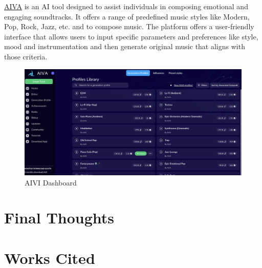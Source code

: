 \documentclass[
]{book}
\begin{document}
\href{https://www.aiva.ai/}{AIVA} is an AI tool designed to assist individuals in composing emotional and engaging soundtracks. It offers a range of predefined music styles like Modern, Pop, Rock, Jazz, etc. and to compose music. The platform offers a user-friendly interface that allows users to input specific parameters and preferences like style, mood and instrumentation and then generate original music that aligns with those criteria.

\begin{figure}

{\centering \includegraphics[width=0.95\linewidth]{AIVI_Dashboard} 

}

\caption{AIVI Dashboard}\label{fig:unnamed-chunk-14}
\end{figure}

\hypertarget{final-thoughts}{%
\chapter{Final Thoughts}\label{final-thoughts}}

\hypertarget{works-cited}{%
\chapter{Works Cited}\label{works-cited}}
\end{document}
